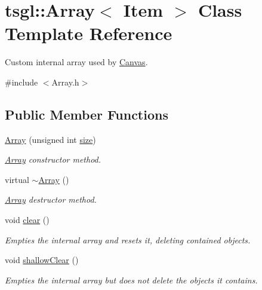 \hypertarget{classtsgl_1_1_array}{}\section{tsgl\+:\+:Array$<$ Item $>$ Class Template Reference}
\label{classtsgl_1_1_array}


Custom internal array used by \hyperlink{classtsgl_1_1_canvas}{Canvas}.  




{\ttfamily \#include $<$Array.\+h$>$}

\subsection*{Public Member Functions}
\begin{DoxyCompactItemize}
\item 
\hyperlink{classtsgl_1_1_array_acc018fe6db37e7eb5df06789de034904}{Array} (unsigned int \hyperlink{classtsgl_1_1_array_a945191eccbeb8ddc0d41d0dcbd0dad27}{size})
\begin{DoxyCompactList}\small\item\em \hyperlink{classtsgl_1_1_array}{Array} constructor method. \end{DoxyCompactList}\item 
virtual \hyperlink{classtsgl_1_1_array_aeef4dedf813a5bac862e19c55dee9069}{$\sim$\+Array} ()
\begin{DoxyCompactList}\small\item\em \hyperlink{classtsgl_1_1_array}{Array} destructor method. \end{DoxyCompactList}\item 
\mbox{\label{classtsgl_1_1_array_acc5f5148a71c7f606be6cc337116bad6}} 
void \hyperlink{classtsgl_1_1_array_acc5f5148a71c7f606be6cc337116bad6}{clear} ()
\begin{DoxyCompactList}\small\item\em Empties the internal array and resets it, deleting contained objects. \end{DoxyCompactList}\item 
void \hyperlink{classtsgl_1_1_array_afe9d7b1dd294e8c74280b961ac84ac10}{shallow\+Clear} ()
\begin{DoxyCompactList}\small\item\em Empties the internal array but does not delete the objects it contains. \end{DoxyCompactList}\item 

\end{DoxyCompactItemize}
